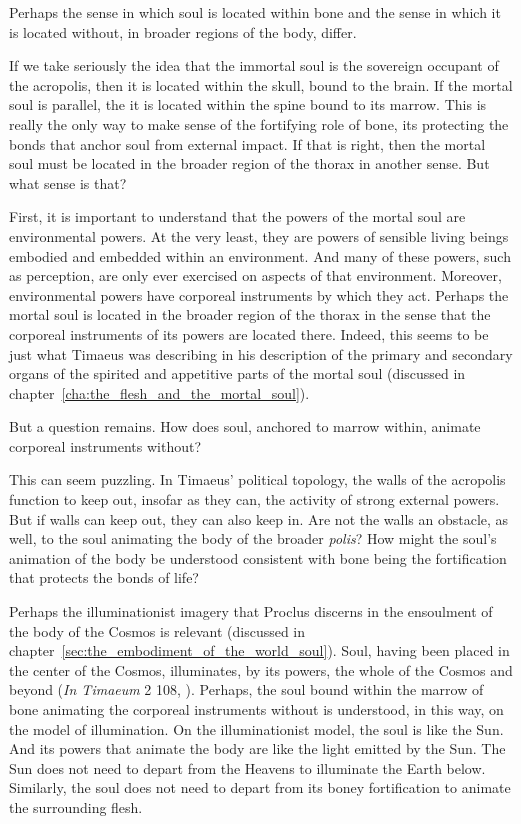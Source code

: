 Perhaps the sense in which soul is located within bone and the sense in which it is located without, in broader regions of the body, differ. 

If we take seriously the idea that the immortal soul is the sovereign occupant of the acropolis, then it is located within the skull, bound to the brain. If the mortal soul is parallel, the it is located within the spine bound to its marrow. This is really the only way to make sense of the fortifying role of bone, its protecting the bonds that anchor soul from external impact. If that is right, then the mortal soul must be located in the broader region of the thorax in another sense. But what sense is that?

First, it is important to understand that the powers of the mortal soul are environmental powers. At the very least, they are powers of sensible living beings embodied and embedded within an environment. And many of these powers, such as perception, are only ever exercised on aspects of that environment. Moreover, environmental powers have corporeal instruments by which they act. Perhaps the mortal soul is located in the broader region of the thorax in the sense that the corporeal instruments of its powers are located there. Indeed, this seems to be just what Timaeus was describing in his description of the primary and secondary organs of the spirited and appetitive parts of the mortal soul (discussed in chapter~\ref{cha:the_flesh_and_the_mortal_soul}).

But a question remains. How does soul, anchored to marrow within, animate corporeal instruments without? 

This can seem puzzling. In Timaeus' political topology, the walls of the acropolis function to keep out, insofar as they can, the activity of strong external powers. But if walls can keep out, they can also keep in. Are not the walls an obstacle, as well, to the soul animating the body of the broader \emph{polis}? How might the soul's animation of the body be understood consistent with bone being the fortification that protects the bonds of life?

Perhaps the illuminationist imagery that Proclus discerns in the ensoulment of the body of the Cosmos is relevant (discussed in chapter~\ref{sec:the_embodiment_of_the_world_soul}). Soul, having been placed in the center of the Cosmos, illuminates, by its powers, the whole of the Cosmos and beyond (\emph{In Timaeum} 2 108, \citealt{Diehl:1903re}). Perhaps, the soul bound within the marrow of bone animating the corporeal instruments without is understood, in this way, on the model of illumination. On the illuminationist model, the soul is like the Sun. And its powers that animate the body are like the light emitted by the Sun. The Sun does not need to depart from the Heavens to illuminate the Earth below. Similarly, the soul does not need to depart from its boney fortification to animate the surrounding flesh. 

